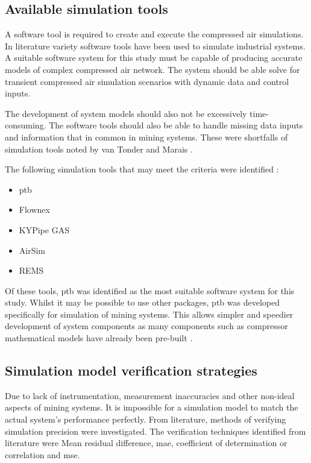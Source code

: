 \subsection{Available simulation tools}
A software tool is required to create and execute the compressed air simulations. In literature variety software tools have been used to simulate industrial systems. A suitable software system for this study must be capable of producing accurate models of complex compressed air network. The system should be able solve for transient compressed air simulation scenarios with dynamic data and control inputs. 
\par 
The development of system models should also not be excessively time-consuming. The software tools should also be able to handle missing data inputs and information that in common in mining systems.  These were shortfalls of simulation tools noted by van Tonder \cite{vanTonder2014PhD} and Marais \cite{Mare2016PhD}.
\par
The following simulation tools that may meet the criteria were identified : 
\begin{itemize}
	\item \gls{ptb}
	\item Flownex
	\item KYPipe GAS
	\item AirSim
	\item REMS
\end{itemize}
Of these tools, \gls{ptb} was identified as the most suitable software system for this study. Whilst it may be possible to use other packages, \gls{ptb} was developed specifically for simulation of mining systems. This allows simpler and speedier development of system components as many components such as compressor mathematical models have already been pre-built \cite{Mare2016PhD}. 
 	\subsection{Simulation model verification strategies}\label{VerificationLit}
 	Due to lack of instrumentation, measurement inaccuracies and other non-ideal aspects of mining systems. It is impossible for a simulation model to match the actual system's performance perfectly. From literature, methods of verifying simulation precision were investigated. The verification techniques identified from literature were Mean residual difference, \gls{mae}, coefficient of determination or correlation and \gls{mse}.%
